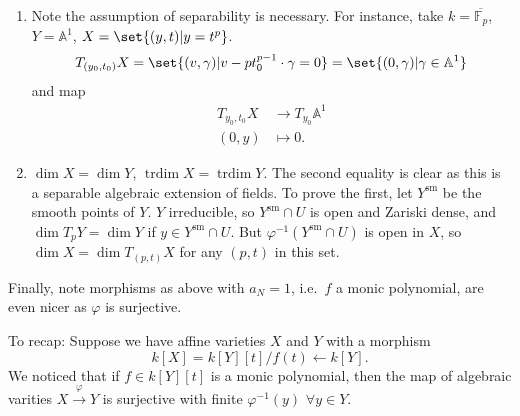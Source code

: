 \documentclass{article}
\newcommand{\A}{\mathbb{A}}
\DeclareMathOperator{\trdim}{trdim}
\begin{document}
\begin{remark}\leavevmode
    \begin{enumerate}[label=(\arabic*)]
        \item Note the assumption of separability is necessary. For instance, take $k = \overline{\mathbb{F}_p}$, $Y = \A^1$, $X = \set{(y, t) | y = t^p}$.
            \begin{equation*}
                T_{(y_0, t_0)} X = \set{(v, \gamma) | v - p t_0^{p-1} \cdot \gamma = 0} = \set{(0, \gamma) | \gamma \in \A^1}
            \end{equation*}
            and map
            \begin{align*}
                T_{y_0,t_0} X &\longrightarrow T_{y_0} \A^1 \\
                (0,y) &\longmapsto 0.
            \end{align*}
        \item $\dim X = \dim Y$, $\trdim X = \trdim Y$. The second equality is clear as this is a separable algebraic extension of fields.
            To prove the first, let $Y^{\text{sm}}$ be the smooth points of $Y$.
            $Y$ irreducible, so $Y^{\text{sm}} \cap U$ is open and Zariski dense, and $\dim T_p Y = \dim Y$ if $y \in Y^{\text{sm}} \cap U$.
            But $\varphi^{-1} (Y^{\text{sm}} \cap U)$ is open in $X$, so $\dim X = \dim T_{(p, t)} X$ for any $(p, t)$ in this set.
    \end{enumerate}
\end{remark}

Finally, note morphisms as above with $a_N = 1$, i.e.\ $f$ a monic polynomial, are even nicer as $\varphi$ is surjective.

To recap:
Suppose we have affine varieties $X$ and $Y$ with a morphism \begin{equation*}k[X] = k[Y][t]/f(t) \leftarrow k[Y].\end{equation*}
We noticed that if $f \in k[Y][t]$ is a monic polynomial, then the map of algebraic varities $X \xrightarrow{\varphi} Y$ is surjective with finite $\varphi^{-1}(y)$ $\forall y \in Y$.
\end{document}
